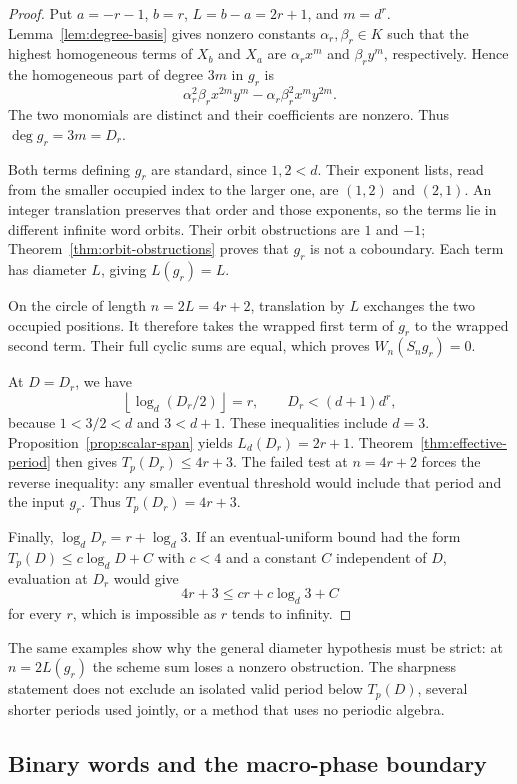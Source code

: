 \begin{proof}
Put $a=-r-1$, $b=r$, $L=b-a=2r+1$, and $m=d^r$.
Lemma~\ref{lem:degree-basis} gives nonzero constants
$\alpha_r,\beta_r\in K$ such that the highest homogeneous terms
of $X_b$ and $X_a$ are $\alpha_rx^m$ and $\beta_ry^m$,
respectively.  Hence the homogeneous part of degree $3m$ in $g_r$ is
\[
 \alpha_r^2\beta_r x^{2m}y^m
 -\alpha_r\beta_r^2 x^my^{2m}.
\]
The two monomials are distinct and their coefficients are nonzero.
Thus $\deg g_r=3m=D_r$.

Both terms defining $g_r$ are standard, since $1,2<d$.
Their exponent lists, read from the smaller occupied index to the
larger one, are $(1,2)$ and $(2,1)$.  An integer translation preserves
that order and those exponents, so the terms lie in different infinite
word orbits.  Their orbit obstructions are $1$ and $-1$;
Theorem~\ref{thm:orbit-obstructions} proves that $g_r$ is not a
coboundary.  Each term has diameter $L$, giving $L(g_r)=L$.

On the circle of length $n=2L=4r+2$, translation by $L$ exchanges
the two occupied positions.  It therefore takes the wrapped first
term of $g_r$ to the wrapped second term.  Their full cyclic sums
are equal, which proves $W_n(S_ng_r)=0$.

At $D=D_r$, we have
\[
 \left\lfloor\log_d(D_r/2)\right\rfloor=r,
 \qquad D_r<(d+1)d^r,
\]
because $1<3/2<d$ and $3<d+1$.  These inequalities include $d=3$.
Proposition~\ref{prop:scalar-span} yields $L_d(D_r)=2r+1$.
Theorem~\ref{thm:effective-period} then gives
$T_p(D_r)\le4r+3$.  The failed test at $n=4r+2$ forces the reverse
inequality: any smaller eventual threshold would include that period
and the input $g_r$.  Thus $T_p(D_r)=4r+3$.

Finally, $\log_dD_r=r+\log_d3$.  If an eventual-uniform bound had
the form $T_p(D)\le c\log_dD+C$ with $c<4$ and a constant $C$
independent of $D$, evaluation at $D_r$ would give
\[
 4r+3\le cr+c\log_d3+C
\]
for every $r$, which is impossible as $r$ tends to infinity.
\end{proof}

The same examples show why the general diameter hypothesis must be
strict: at $n=2L(g_r)$ the scheme sum loses a nonzero obstruction.
The sharpness statement does not exclude an isolated valid period
below $T_p(D)$, several shorter periods used jointly, or a method
that uses no periodic algebra.

\subsection{Binary words and the macro-phase boundary}

